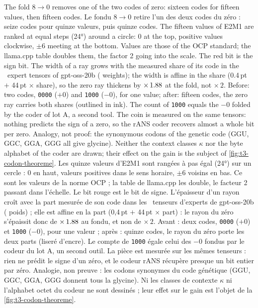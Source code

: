   {The fold $8\to0$ removes one of the two codes of zero: sixteen codes for fifteen values, then fifteen codes.}
  {Le fondu $8\to0$ retire l'un des deux codes du zéro : seize codes pour quinze valeurs, puis quinze codes.}
  {The fifteen values of E2M1 are ranked at equal steps (24°) around a circle: $0$ at the top, positive values
   clockwise, $\pm6$ meeting at the bottom. Values are those of the OCP standard; the llama.cpp table doubles them,
   the factor 2 going into the scale. The red bit is the sign bit. The width of a ray grows with the measured
   share of its code in the \CodonNRoueTenseurs\ expert tensors of gpt-oss-20b (\CodonNum{\CodonNRouePoids}
   weights); the width is affine in the share (0.4\,pt $+$ 44\,pt $\times$ share), so the zero ray thickens by
   $\times\,\CodonNum{\CodonNRoueEpaisseur}$ at the fold, not $\times\,2$. Before: two codes, \texttt{0000} ($+0$)
   and \texttt{1000} ($-0$), for one value; after: fifteen codes, the zero ray carries both shares (outlined in
   ink). The count of \texttt{1000} equals the $-0$ folded by the coder of lot A, a second tool. The coin is
   measured on the same tensors: nothing predicts the sign of a zero, so the rANS coder recovers almost a whole bit
   per zero. Analogy, not proof: the synonymous codons of the genetic code (GGU, GGC, GGA, GGG all give glycine).
   Neither the context classes $\kappa$ nor the byte alphabet of the coder are drawn; their effect on the gain is
   the subject of \cref{fig:t3-codon-theoreme}.}
  {Les quinze valeurs d'E2M1 sont rangées à pas égal (24°) sur un cercle : $0$ en haut, valeurs positives dans le
   sens horaire, $\pm6$ voisins en bas. Ce sont les valeurs de la norme OCP ; la table de llama.cpp les double, le
   facteur 2 passant dans l'échelle. Le bit rouge est le bit de signe. L'épaisseur d'un rayon croît avec la part
   mesurée de son code dans les \CodonNRoueTenseurs\ tenseurs d'experts de gpt-oss-20b (\CodonNum{\CodonNRouePoids}
   poids) ; elle est affine en la part (0,4\,pt $+$ 44\,pt $\times$ part) : le rayon du zéro s'épaissit donc de
   $\times\,\CodonNum{\CodonNRoueEpaisseur}$ au fondu, et non de $\times\,2$. Avant : deux codes, \texttt{0000}
   ($+0$) et \texttt{1000} ($-0$), pour une valeur ; après : quinze codes, le rayon du zéro porte les deux parts
   (liseré d'encre). Le compte de \texttt{1000} égale celui des $-0$ fondus par le codeur du lot A, un second
   outil. La pièce est mesurée sur les mêmes tenseurs : rien ne prédit le signe d'un zéro, et le codeur rANS
   récupère presque un bit entier par zéro. Analogie, non preuve : les codons synonymes du code génétique (GGU,
   GGC, GGA, GGG donnent tous la glycine). Ni les classes de contexte $\kappa$ ni l'alphabet octet du codeur ne
   sont dessinés ; leur effet sur le gain est l'objet de la \cref{fig:t3-codon-theoreme}.}

